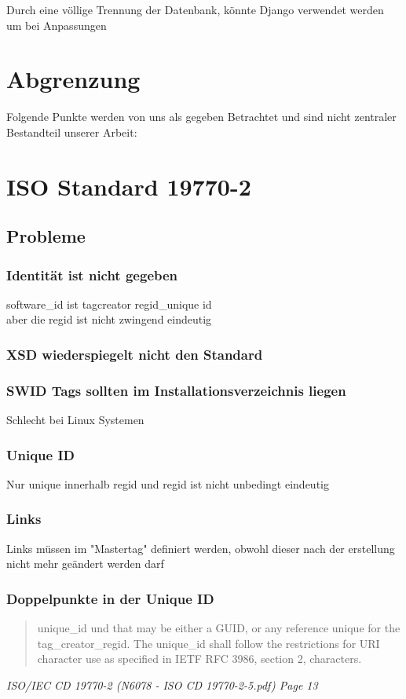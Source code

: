 Durch eine völlige Trennung der Datenbank, könnte Django verwendet werden um bei Anpassungen

\section{Abgrenzung}
Folgende Punkte werden von uns als gegeben Betrachtet und sind nicht zentraler
Bestandteil unserer Arbeit:

\section{ISO Standard 19770-2} 

\subsection{Probleme}

\subsubsection{Identität ist nicht gegeben}
software\_id ist tagcreator regid\_unique id\\
aber die regid ist nicht zwingend eindeutig

\subsubsection{XSD wiederspiegelt nicht den Standard}

\subsubsection{SWID Tags sollten im Installationsverzeichnis liegen}
Schlecht bei Linux Systemen

\subsubsection{Unique ID}
Nur unique innerhalb regid und regid ist nicht unbedingt eindeutig

\subsubsection{Links}
Links müssen im "Mastertag" definiert werden, obwohl dieser nach der erstellung
nicht mehr geändert werden darf


\subsubsection{Doppelpunkte in der Unique ID} 
\begin{quote}
unique\_id und that may
be either a GUID, or any reference unique for the tag\_creator\_regid. The
unique\_id shall follow the restrictions for URI character use as specified in
IETF RFC 3986, section 2, characters. 
\end{quote} 
\textit{ISO/IEC CD 19770-2 (N6078 - ISO CD 19770-2-5.pdf) Page 13}

